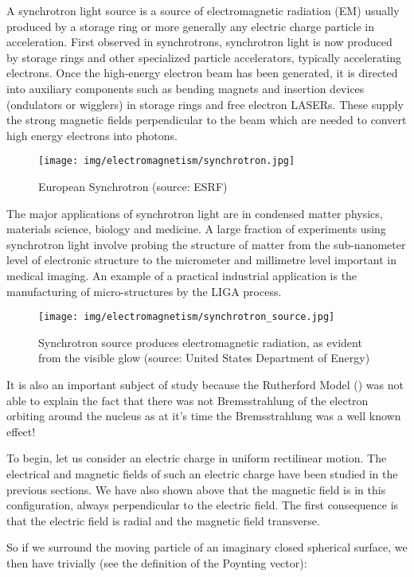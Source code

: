 	A synchrotron light source is a source of electromagnetic radiation (EM) usually produced by a storage ring or more generally any electric charge particle in acceleration. First observed in synchrotrons, synchrotron light is now produced by storage rings and other specialized particle accelerators, typically accelerating electrons. Once the high-energy electron beam has been generated, it is directed into auxiliary components such as bending magnets and insertion devices (ondulators or wigglers) in storage rings and free electron LASERs. These supply the strong magnetic fields perpendicular to the beam which are needed to convert high energy electrons into photons.
	\begin{figure}[H]
		\centering
		\texttt{[image: img/electromagnetism/synchrotron.jpg]}
		\caption[European Synchrotron]{European Synchrotron (source: ESRF)}
	\end{figure}
	The major applications of synchrotron light are in condensed matter physics, materials science, biology and medicine. A large fraction of experiments using synchrotron light involve probing the structure of matter from the sub-nanometer level of electronic structure to the micrometer and millimetre level important in medical imaging. An example of a practical industrial application is the manufacturing of micro-structures by the LIGA process.
	\begin{figure}[H]
		\centering
		\texttt{[image: img/electromagnetism/synchrotron\_source.jpg]}
		\caption[Synchrotron source produces electromagnetic radiation]{Synchrotron source produces electromagnetic radiation, as evident from the visible glow (source: United States Department of Energy)}
	\end{figure}
	It is also an important subject of study because the Rutherford  Model () was not able to explain the fact that there was not Bremsstrahlung of the electron orbiting around the nucleus as at it's time the Bremsstrahlung was a well known effect!
	
	To begin, let us consider an electric charge in uniform rectilinear motion. The electrical and magnetic fields of such an electric charge have been studied in the previous sections. We have also shown above that the magnetic field is in this configuration, always perpendicular to the electric field. The first consequence is that the electric field is radial and the magnetic field transverse.

	So if we surround the moving particle of an imaginary closed spherical surface, we then have trivially (see the definition of the Poynting vector):
	
